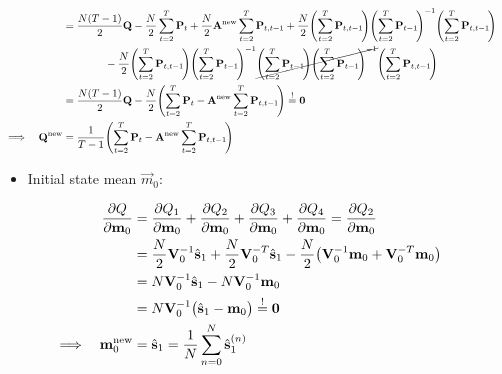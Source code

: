 \begin{align}
		&&	&= \frac{N(T - 1)}{2} \mat{Q} - \frac{N}{2} \sum_{t = 2}^{T} \mat{P}_t + \frac{N}{2} \mat{A}^\new \sum_{t = 2}^{T} \mat{P}_{t, t - 1} + \frac{N}{2} \Bigg(\! \sum_{t = 2}^{T} \mat{P}_{t, t - 1} \!\Bigg) \Bigg(\! \sum_{t = 2}^{T} \mat{P}_{t - 1} \!\Bigg)^{-1} \Bigg(\! \sum_{t = 2}^{T} \mat{P}_{t, t - 1} \!\Bigg) & \nonumber \\
			&&	&\qquad\qquad - \frac{N}{2} \Bigg(\! \sum_{t = 2}^{T} \mat{P}_{t, t - 1} \!\Bigg) \Bigg(\! \sum_{t = 2}^{T} \mat{P}_{t - 1} \!\Bigg)^{-1} \cancel{\Bigg(\! \sum_{t = 2}^{T} \mat{P}_{t - 1} \!\Bigg) \Bigg(\! \sum_{t = 2}^{T} \mat{P}_{t - 1} \!\Bigg)^{-1}} \Bigg(\! \sum_{t = 2}^{T} \mat{P}_{t, t - 1} \!\Bigg) & \nonumber \\
		&&	&= \frac{N(T - 1)}{2} \mat{Q} - \frac{N}{2} \Bigg(\! \sum_{t = 2}^{T} \mat{P}_t - \mat{A}^\new \sum_{t = 2}^{T} \mat{P}_{t, t - 1} \!\Bigg) \overset{!}{=} \mat{0} & \nonumber \\
		\implies && \mat{Q}^\new &= \frac{1}{T - 1} \Bigg(\! \sum_{t = 2}^{T} \mat{P}_t - \mat{A}^\new \sum_{t = 2}^{T} \mat{P}_{t, t - 1} \!\Bigg) & \label{eqn:stateNoiseCovariance}
	\end{align}

	\begin{itemize}
		\item Initial state mean \(\vec{m}_0\):
	\end{itemize}
	\begin{align}
		&&\pdv{Q}{\boldsymbol{\mathrm{m}}_0}
			&= \pdv{Q_1}{\boldsymbol{\mathrm{m}}_0} + \pdv{Q_2}{\boldsymbol{\mathrm{m}}_0} + \pdv{Q_3}{\boldsymbol{\mathrm{m}}_0} + \pdv{Q_4}{\boldsymbol{\mathrm{m}}_0} = \pdv{Q_2}{\boldsymbol{\mathrm{m}}_0} & \nonumber \\
		&&	&= \frac{N}{2} \boldsymbol{\mathrm{V}}_0^{-1} \hat{\boldsymbol{\mathrm{s}}}_1 + \frac{N}{2} \boldsymbol{\mathrm{V}}_0^{-T} \hat{\boldsymbol{\mathrm{s}}}_1 - \frac{N}{2} \big( \boldsymbol{\mathrm{V}}_0^{-1} \boldsymbol{\mathrm{m}}_0 + \boldsymbol{\mathrm{V}}_0^{-T} \boldsymbol{\mathrm{m}}_0 \big) & \nonumber \\
		&&	&= N \boldsymbol{\mathrm{V}}_0^{-1} \hat{\boldsymbol{\mathrm{s}}}_1 - N \boldsymbol{\mathrm{V}}_0^{-1} \boldsymbol{\mathrm{m}}_0 & \nonumber \\
		&&	&= N \boldsymbol{\mathrm{V}}_0^{-1} \big( \hat{\boldsymbol{\mathrm{s}}}_1 - \boldsymbol{\mathrm{m}}_0 \big) \overset{!}{=} \boldsymbol{\mathrm{0}} & \nonumber \\
		\implies && \boldsymbol{\mathrm{m}}_0^{\mathrm{new}} &= \hat{\boldsymbol{\mathrm{s}}}_1 = \frac{1}{N} \sum_{n = 0}^{N} \hat{\boldsymbol{\mathrm{s}}}_1^{(n)} & \label{eqn:initialStateMean}
	\end{align}
	
